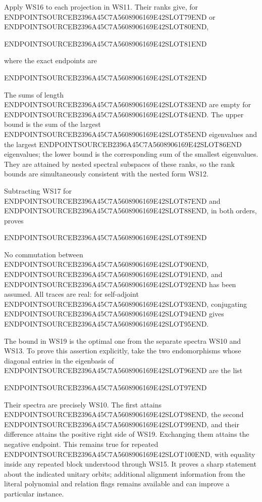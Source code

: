 Apply WS16 to each projection in WS11. Their ranks give, for ENDPOINTSOURCEB2396A45C7A5608906169E42SLOT79END or ENDPOINTSOURCEB2396A45C7A5608906169E42SLOT80END,

ENDPOINTSOURCEB2396A45C7A5608906169E42SLOT81END

where the exact endpoints are

ENDPOINTSOURCEB2396A45C7A5608906169E42SLOT82END

The sums of length ENDPOINTSOURCEB2396A45C7A5608906169E42SLOT83END are empty for ENDPOINTSOURCEB2396A45C7A5608906169E42SLOT84END. The upper bound is the sum of the largest ENDPOINTSOURCEB2396A45C7A5608906169E42SLOT85END eigenvalues and the largest ENDPOINTSOURCEB2396A45C7A5608906169E42SLOT86END eigenvalues; the lower bound is the corresponding sum of the smallest eigenvalues. They are attained by nested spectral subspaces of these ranks, so the rank bounds are simultaneously consistent with the nested form WS12.

Subtracting WS17 for ENDPOINTSOURCEB2396A45C7A5608906169E42SLOT87END and ENDPOINTSOURCEB2396A45C7A5608906169E42SLOT88END, in both orders, proves

ENDPOINTSOURCEB2396A45C7A5608906169E42SLOT89END

No commutation between ENDPOINTSOURCEB2396A45C7A5608906169E42SLOT90END, ENDPOINTSOURCEB2396A45C7A5608906169E42SLOT91END, and ENDPOINTSOURCEB2396A45C7A5608906169E42SLOT92END has been assumed. All traces are real: for self-adjoint ENDPOINTSOURCEB2396A45C7A5608906169E42SLOT93END, conjugating ENDPOINTSOURCEB2396A45C7A5608906169E42SLOT94END gives ENDPOINTSOURCEB2396A45C7A5608906169E42SLOT95END.

The bound in WS19 is the optimal one from the separate spectra WS10 and WS13. To prove this assertion explicitly, take the two endomorphisms whose diagonal entries in the eigenbasis of ENDPOINTSOURCEB2396A45C7A5608906169E42SLOT96END are the list

ENDPOINTSOURCEB2396A45C7A5608906169E42SLOT97END

Their spectra are precisely WS10. The first attains ENDPOINTSOURCEB2396A45C7A5608906169E42SLOT98END, the second ENDPOINTSOURCEB2396A45C7A5608906169E42SLOT99END, and their difference attains the positive right side of WS19. Exchanging them attains the negative endpoint. This remains true for repeated ENDPOINTSOURCEB2396A45C7A5608906169E42SLOT100END, with equality inside any repeated block understood through WS15. It proves a sharp statement about the indicated unitary orbits; additional alignment information from the literal polynomial and relation flags remains available and can improve a particular instance.

